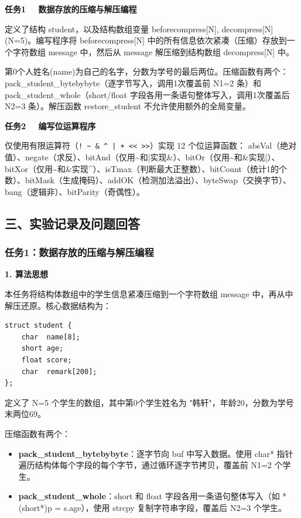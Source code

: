 \documentclass[12pt,a4paper]{ctexart}
\newcommand{\studentname}{韩轩}
\begin{document}
\textbf{任务1 \ \ 数据存放的压缩与解压编程}

定义了结构 student，以及结构数组变量 beforecompress[N], decompress[N] (N=5)。编写程序将 beforecompress[N] 中的所有信息依次紧凑（压缩）存放到一个字符数组 message 中，然后从 message 解压缩到结构数组 decompress[N] 中。

第0个人姓名(name)为自己的名字，分数为学号的最后两位。压缩函数有两个：pack\_student\_bytebybyte（逐字节写入，调用1次覆盖前 N1=2 条）和 pack\_student\_whole（short/float 字段各用一条语句整体写入，调用1次覆盖后 N2=3 条）。解压函数 restore\_student 不允许使用额外的全局变量。

\textbf{任务2 \ \ 编写位运算程序}

仅使用有限运算符（\texttt{! \~{} \& \^{} | + << >>}）实现 12 个位运算函数：
absVal（绝对值）、negate（求反）、bitAnd（仅用\~{}和|实现\&）、bitOr（仅用\~{}和\&实现|）、bitXor（仅用\~{}和\&实现\^{}）、isTmax（判断最大正整数）、bitCount（统计1的个数）、bitMask（生成掩码）、addOK（检测加法溢出）、byteSwap（交换字节）、bang（逻辑非）、bitParity（奇偶性）。

\subsection*{三、实验记录及问题回答}

\subsubsection*{任务1：数据存放的压缩与解压编程}

\textbf{1. 算法思想}

本任务将结构体数组中的学生信息紧凑压缩到一个字符数组 message 中，再从中解压还原。核心数据结构为：

\begin{lstlisting}
struct student {
    char  name[8];
    short age;
    float score;
    char  remark[200];
};
\end{lstlisting}

定义了 N=5 个学生的数组，其中第0个学生姓名为 "\studentname"，年龄20，分数为学号末两位69。

压缩函数有两个：
\begin{itemize}[nosep]
    \item \textbf{pack\_student\_bytebybyte}：逐字节向 buf 中写入数据。使用 char* 指针遍历结构体每个字段的每个字节，通过循环逐字节拷贝，覆盖前 N1=2 个学生。
    \item \textbf{pack\_student\_whole}：short 和 float 字段各用一条语句整体写入（如 *(short*)p = s.age），使用 strcpy 复制字符串字段，覆盖后 N2=3 个学生。
\end{itemize}
\end{document}
